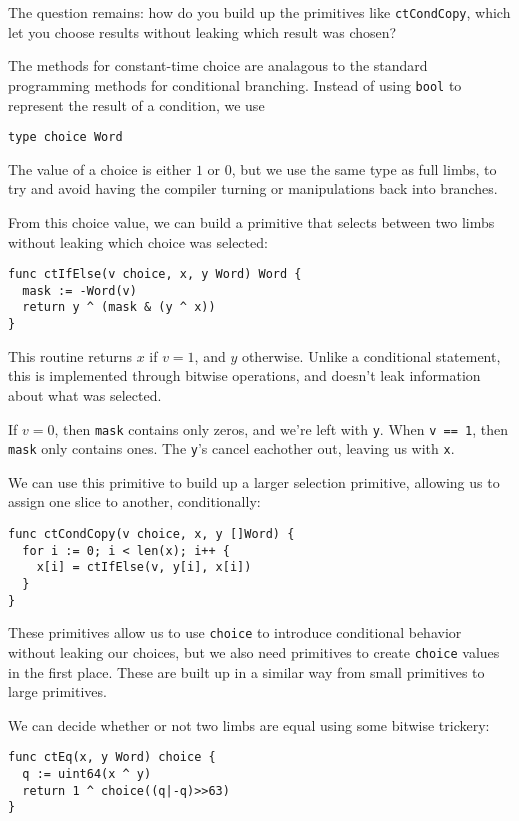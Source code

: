 \documentclass[11pt, a4paper]{article} %
\begin{document}
{The question remains: how do you build up the primitives like
\texttt{ctCondCopy}, which let you choose results without
leaking which result was chosen?

The methods for constant-time choice are analagous to the standard
programming methods for conditional branching. Instead of using
\texttt{bool} to represent the result of a condition, we use

\begin{verbatim}
type choice Word
\end{verbatim}

The value of a choice is either $1$ or $0$, but we use the same
type as full limbs, to try and avoid having the compiler
turning or manipulations back into branches.

From this choice value, we can build a primitive that selects
between two limbs without leaking which choice was selected:

\begin{verbatim}
func ctIfElse(v choice, x, y Word) Word {
  mask := -Word(v)
  return y ^ (mask & (y ^ x))
} 
\end{verbatim}

This routine returns $x$ if $v = 1$, and $y$ otherwise. Unlike
a conditional statement, this is implemented through bitwise operations,
and doesn't leak information about what was selected.

If $v = 0$, then \texttt{mask} contains only zeros, and we're left
with \texttt{y}. When \texttt{v == 1},
then \texttt{mask} only contains ones. The \texttt{y}'s cancel eachother out,
leaving us with \texttt{x}.

We can use this primitive to build up a larger selection primitive,
allowing us to assign one slice to another, conditionally:

\begin{verbatim}
func ctCondCopy(v choice, x, y []Word) {
  for i := 0; i < len(x); i++ {
    x[i] = ctIfElse(v, y[i], x[i])
  }
}
\end{verbatim}

These primitives allow us to use \texttt{choice} to introduce conditional
behavior without leaking our choices, but we also need primitives to
create \texttt{choice} values in the first place. These are built up
in a similar way from small primitives to large primitives.

We can decide whether or not two limbs are equal using some bitwise
trickery:

\begin{verbatim}
func ctEq(x, y Word) choice {
  q := uint64(x ^ y)
  return 1 ^ choice((q|-q)>>63)
}
\end{verbatim}

}
\end{document}
